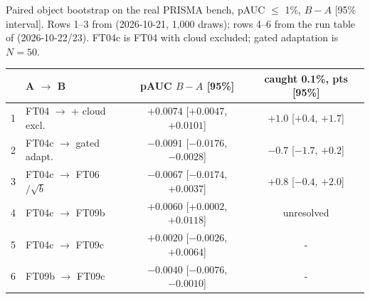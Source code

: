 \begin{drift}
Paired object bootstrap on the real PRISMA bench, pAUC $\le$ 1\%, $B - A$ [95\% interval]. Rows 1--3 from
 (2026-10-21, 1,000 draws); rows 4--6 from the run table of
 (2026-10-22/23). FT04c is FT04 with cloud excluded; gated adaptation is $N = 50$.
\begin{center}
\small
\begin{tabular}{clcc}
\toprule
 & A $\to$ B & pAUC $B - A$ [95\%] & caught 0.1\%, pts [95\%] \\
\midrule
1 & FT04 $\to$ + cloud excl. & $+0.0074$ [$+0.0047$, $+0.0101$] & $+1.0$ [$+0.4$, $+1.7$] \\
2 & FT04c $\to$ gated adapt. & $-0.0091$ [$-0.0176$, $-0.0028$] & $-0.7$ [$-1.7$, $+0.2$] \\
3 & FT04c $\to$ FT06 $/\sqrt{b}$ & $-0.0067$ [$-0.0174$, $+0.0037$] & $+0.8$ [$-0.4$, $+2.0$] \\
4 & FT04c $\to$ FT09b & $+0.0060$ [$+0.0002$, $+0.0118$] & unresolved \\
5 & FT04c $\to$ FT09c & $+0.0020$ [$-0.0026$, $+0.0064$] & - \\
6 & FT09b $\to$ FT09c & $-0.0040$ [$-0.0076$, $-0.0010$] & - \\
\bottomrule
\end{tabular}
\label{tab:bootstrap:results}
\end{center}
\end{drift}

